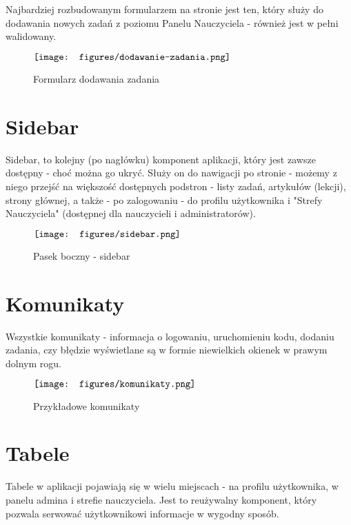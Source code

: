 \documentclass[shortabstract,inz]{iithesis}
\begin{document}
Najbardziej rozbudowanym formularzem na stronie jest ten, który służy do dodawania nowych zadań z poziomu Panelu Nauczyciela - również jest w pełni walidowany.

\begin{figure}[H]
	\centering
	$\vcenter{\hbox{\texttt{[image: figures/dodawanie-zadania.png]}}}$
    \caption[]{Formularz dodawania zadania}
    \label{fig:formularz-zadanie}
\end{figure}

\newpage

\section{Sidebar}
Sidebar, to kolejny (po nagłówku) komponent aplikacji, który jest zawsze dostępny - choć można go ukryć. Służy on do nawigacji po stronie - możemy z niego przejść na większość dostępnych podstron - listy zadań, artykułów (lekcji), strony głównej, a także - po zalogowaniu - do profilu użytkownika i "Strefy Nauczyciela" (dostępnej dla nauczycieli i administratorów).

\begin{figure}[H]
	\centering
	$\vcenter{\hbox{\texttt{[image: figures/sidebar.png]}}}$
    \caption[]{Pasek boczny - sidebar}
    \label{fig:sidebar}
\end{figure}

\newpage

\section{Komunikaty}
Wszystkie komunikaty - informacja o logowaniu, uruchomieniu kodu, dodaniu zadania, czy błędzie wyświetlane są w formie niewielkich okienek w prawym dolnym rogu. 

\begin{figure}[H]
	\centering
	$\vcenter{\hbox{\texttt{[image: figures/komunikaty.png]}}}$
    \caption[]{Przykładowe komunikaty}
    \label{fig:komunikaty}
\end{figure}

\section{Tabele}

Tabele w aplikacji pojawiają się w wielu miejscach - na profilu użytkownika, w panelu admina i strefie nauczyciela. Jest to reużywalny komponent, który pozwala serwować użytkownikowi informacje w wygodny sposób.
\end{document}
